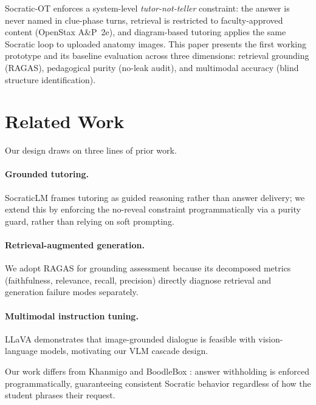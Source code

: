 \documentclass[11pt]{article}
\begin{document}
Socratic-OT enforces a system-level \emph{tutor-not-teller} constraint:
the answer is never named in clue-phase turns, retrieval is restricted to
faculty-approved content (OpenStax A\&P~2e), and diagram-based tutoring
applies the same Socratic loop to uploaded anatomy images.
This paper presents the first working prototype and its baseline evaluation
across three dimensions: retrieval grounding (RAGAS), pedagogical purity
(no-leak audit), and multimodal accuracy (blind structure identification).

\section{Related Work}

Our design draws on three lines of prior work.

\paragraph{Grounded tutoring.}
SocraticLM \citep{socraticlm} frames tutoring as guided reasoning rather than
answer delivery; we extend this by enforcing the no-reveal constraint
programmatically via a purity guard, rather than relying on soft prompting.

\paragraph{Retrieval-augmented generation.}
We adopt RAGAS \citep{es2024ragas,ragas_docs} for grounding assessment because
its decomposed metrics (faithfulness, relevance, recall, precision) directly
diagnose retrieval and generation failure modes separately.

\paragraph{Multimodal instruction tuning.}
LLaVA \citep{llava,llava16} demonstrates that image-grounded dialogue is
feasible with vision-language models, motivating our VLM cascade design.

Our work differs from Khanmigo \citep{khanmigo} and BoodleBox
\citep{boodlebox,boodlebox_bots}: answer withholding is enforced
programmatically, guaranteeing consistent Socratic behavior regardless of
how the student phrases their request.

\end{document}
